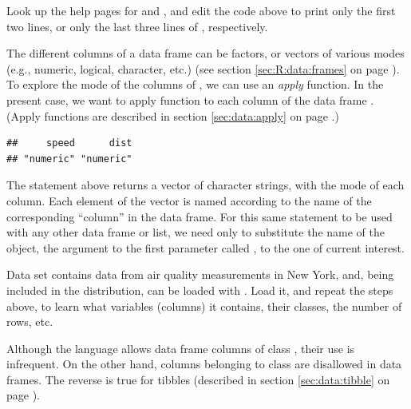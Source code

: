\documentclass[krantz2]{krantz}\usepackage{knitr}
\begin{document}
\begin{playground}
Look up the help pages for  and , and edit the code above to print only the first two lines, or only the last three lines of , respectively.
\end{playground}

The different columns of a data frame can be factors, or vectors of various modes (e.g., numeric, logical, character, etc.) (see section \ref{sec:R:data:frames} on page \pageref{sec:R:data:frames}).
To explore the mode of the columns of , we can use an \emph{apply} function. In the present case, we want to apply function  to each column of the data frame . (Apply functions are described in section \ref{sec:data:apply} on page \pageref{sec:data:apply}.)

\begin{knitrout}\footnotesize
{}\color{fgcolor}\begin{kframe}
\begin{alltt}
\hlstd{(}   
\end{alltt}
\begin{verbatim}
##     speed      dist 
## "numeric" "numeric"
\end{verbatim}
\end{kframe}
\end{knitrout}

The statement above returns a vector of character strings, with the mode of each column. Each element of the vector is named according to the name of the corresponding ``column'' in the data frame. For this same statement to be used with any other data frame or list, we need only to substitute the name of the object, the argument to the first parameter called , to the one of current interest.

\begin{playground}
Data set  contains data from air quality measurements in New York, and, being included in the \Rpgrm distribution, can be loaded with . Load it, and repeat the steps above, to learn what variables (columns) it contains, their classes, the number of rows, etc.
\end{playground}

\begin{explainbox}
Although the \Rlang language allows data frame columns of class , their use is infrequent. On the other hand, columns belonging to class  are disallowed in data frames. The reverse is true for tibbles (described in section \ref{sec:data:tibble} on page \pageref{sec:data:tibble}).
\end{explainbox}
\end{document}
